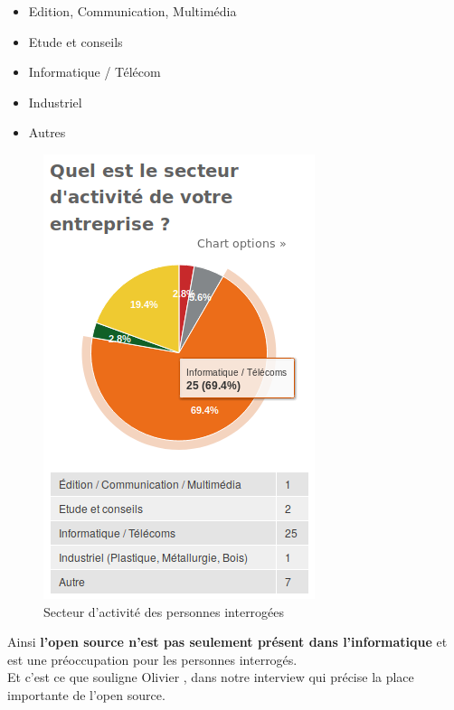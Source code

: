 			\begin{itemize}[label=\textbullet, font=\LARGE \color{burntorange}]
				\item Edition, Communication, Multimédia
				\item Etude et conseils
				\item Informatique / Télécom
				\item Industriel
				\item Autres
			\end{itemize}

			\begin{figure}[!htb]
				\center
				\includegraphics[scale=0.58]{./img/a1}
				\caption{Secteur d'activité des personnes interrogées}
			\end{figure}

			Ainsi \textbf{l'open source n'est pas seulement présent dans l'informatique} et est une préoccupation pour les personnes interrogés.\\

			Et c'est ce que souligne Olivier , dans notre interview qui précise la place importante de l'open source.

			\begin{center}
				\textit{
				}
			\end{center}

